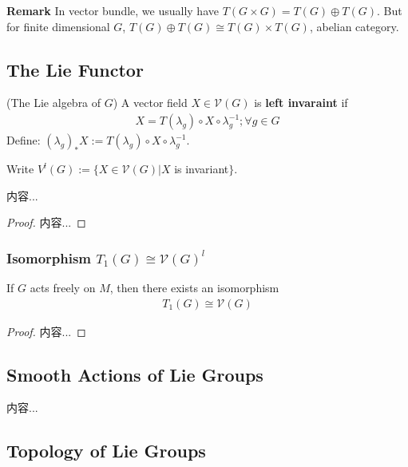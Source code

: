 \documentclass[Total.tex]{subfiles}
\begin{document}
				\textbf{Remark} In vector bundle, we usually have $T(G\times G)=T(G)\oplus T(G)$. But for finite dimensional $G$, $T(G)\oplus T(G)\cong T(G)\times T(G)$, abelian category. 
				
			\subsection{The Lie Functor}
				\begin{Def}
					(The Lie algebra of $G$) A vector field $X\in \mathcal{V}(G)$ is \textbf{left invaraint} if 
					\begin{gather*}
						X=T(\lambda_g)\circ X\circ \lambda_g^{-1};\forall g\in G
					\end{gather*}
					Define: $(\lambda_g)_*X:=T(\lambda_g)\circ X\circ \lambda_g^{-1}$. 
				\end{Def}
				
				Write $V^l(G):=\{X\in \mathcal{V}(G)|X$ is invariant$\}$. 
				
				\begin{proposition}
					内容...
				\end{proposition}
				\begin{proof}
					内容...
				\end{proof}
				
				\subsubsection{Isomorphism $T_1(G)\cong \mathcal{V}(G)^l$}
				
					\begin{corollary}
						If $G$ acts freely on $M$, then there exists an isomorphism
						\begin{gather*}
							T_1(G)\cong \mathcal{V}(G)
						\end{gather*}
					\end{corollary}
					\begin{proof}
						内容...
					\end{proof}
			\subsection{Smooth Actions of Lie Groups}
				\begin{Def}
					内容...
				\end{Def}
			\subsection{Topology of Lie Groups}
\end{document}
